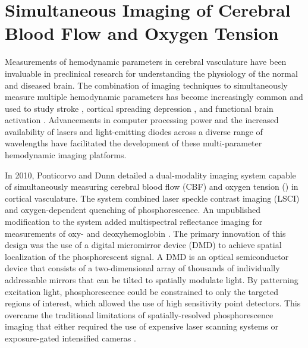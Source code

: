 
\chapter{Simultaneous Imaging of Cerebral Blood Flow and Oxygen Tension} \label{ch:system}

Measurements of hemodynamic parameters in cerebral vasculature have been invaluable in preclinical research for understanding the physiology of the normal and diseased brain. The combination of imaging techniques to simultaneously measure multiple hemodynamic parameters has become increasingly common and used to study stroke \cite{Jones:2008gb}, cortical spreading depression \cite{Sakadzic:2009jo}, and functional brain activation \cite{Dunn:2005gw, Dunn:2003wy}. Advancements in computer processing power and the increased availability of lasers and light-emitting diodes across a diverse range of wavelengths have facilitated the development of these multi-parameter hemodynamic imaging platforms.

In 2010, Ponticorvo and Dunn \cite{Ponticorvo:2010uv} detailed a dual-modality imaging system capable of simultaneously measuring cerebral blood flow (CBF) and oxygen tension () in cortical vasculature. The system combined laser speckle contrast imaging (LSCI) and oxygen-dependent quenching of phosphorescence. An unpublished modification to the system added multispectral reflectance imaging for measurements of oxy- and deoxyhemoglobin \cite{Ponticorvo:2010ur}. The primary innovation of this design was the use of a digital micromirror device (DMD) to achieve spatial localization of the phosphorescent signal. A DMD is an optical semiconductor device that consists of a two-dimensional array of thousands of individually addressable mirrors that can be tilted to spatially modulate light. By patterning excitation light, phosphorescence could be constrained to only the targeted regions of interest, which allowed the use of high sensitivity point detectors. This overcame the traditional limitations of spatially-resolved phosphorescence imaging that either required the use of expensive laser scanning systems \cite{Yaseen:2009ep, Kazmi:2013ey} or exposure-gated intensified cameras \cite{Shonat:2003ia, Sakadzic:2009jo}.

